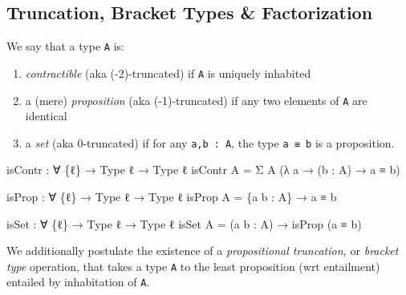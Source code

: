 \documentclass[
  11pt,
  oneside,
  article]{memoir}
\newenvironment{Shaded}{}{}
\newcommand{\NormalTok}[1]{#1}
\newcommand{\OtherTok}[1]{\textcolor[rgb]{0.00,0.44,0.13}{#1}}
\providecommand{\tightlist}{%
  \setlength{\itemsep}{0pt}\setlength{\parskip}{0pt}}
\theoremstyle{definition}
\theoremstyle{plain}
\newcommand{\0}{\textsf{0}}
\newcommand{\1}{\tn{\textsf{1}}}
\begin{document}
\subsection{Truncation, Bracket Types \&
Factorization}\label{truncation-bracket-types-factorization}

We say that a type \texttt{A} is:

\begin{enumerate}
\def\labelenumi{\arabic{enumi}.}
\tightlist
\item
  \emph{contractible} (aka (-2)-truncated) if \texttt{A} is uniquely
  inhabited
\item
  a (mere) \emph{proposition} (aka (-1)-truncated) if any two elements
  of \texttt{A} are identical
\item
  a \emph{set} (aka 0-truncated) if for any \texttt{a,b\ :\ A}, the type
  \texttt{a\ ≡\ b} is a proposition.
\end{enumerate}

\begin{Shaded}
\begin{Highlighting}[]
\NormalTok{isContr }\OtherTok{:} \OtherTok{∀} \OtherTok{\{}\NormalTok{ℓ}\OtherTok{\}} \OtherTok{→}\NormalTok{ Type ℓ }\OtherTok{→}\NormalTok{ Type ℓ}
\NormalTok{isContr A }\OtherTok{=}\NormalTok{ Σ A }\OtherTok{(λ}\NormalTok{ a }\OtherTok{→} \OtherTok{(}\NormalTok{b }\OtherTok{:}\NormalTok{ A}\OtherTok{)} \OtherTok{→}\NormalTok{ a ≡ b}\OtherTok{)}

\NormalTok{isProp }\OtherTok{:} \OtherTok{∀} \OtherTok{\{}\NormalTok{ℓ}\OtherTok{\}} \OtherTok{→}\NormalTok{ Type ℓ }\OtherTok{→}\NormalTok{ Type ℓ}
\NormalTok{isProp A }\OtherTok{=} \OtherTok{\{}\NormalTok{a b }\OtherTok{:}\NormalTok{ A}\OtherTok{\}} \OtherTok{→}\NormalTok{ a ≡ b}

\NormalTok{isSet }\OtherTok{:} \OtherTok{∀} \OtherTok{\{}\NormalTok{ℓ}\OtherTok{\}} \OtherTok{→}\NormalTok{ Type ℓ }\OtherTok{→}\NormalTok{ Type ℓ}
\NormalTok{isSet A }\OtherTok{=} \OtherTok{(}\NormalTok{a b }\OtherTok{:}\NormalTok{ A}\OtherTok{)} \OtherTok{→}\NormalTok{ isProp }\OtherTok{(}\NormalTok{a ≡ b}\OtherTok{)}
\end{Highlighting}
\end{Shaded}

We additionally postulate the existence of a \emph{propositional
truncation,} or \emph{bracket type} operation, that takes a type
\texttt{A} to the least proposition (wrt entailment) entailed by
inhabitation of \texttt{A}.
\end{document}
